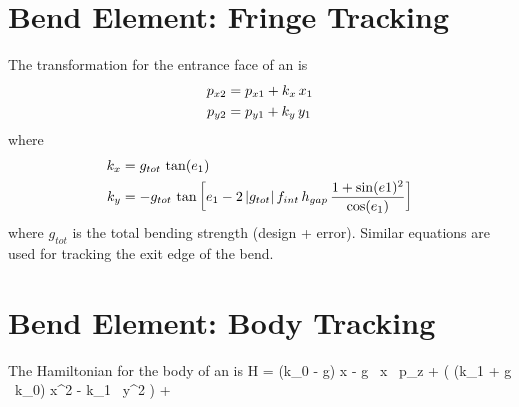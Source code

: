 \section{Bend Element: Fringe Tracking}
\label{s:.bend.fringe.std}

The transformation for the entrance face of an  is
\begin{align}
  p_{x2} &= p_{x1} + k_x \, x_1 \nonumber \\
  p_{y2} &= p_{y1} + k_y \, y_1
\end{align}
where
\begin{align}
  k_x &= g_{tot} \, \tan(e_1) \nonumber \\
  k_y &= -g_{tot} \, \tan \left[ e_1 - 2 \, |g_{tot}| \, f_{int} \,  h_{gap} \, 
    \frac{1 + \sin(e1)^2}{\cos(e_1)} \right]
\end{align}
where $g_{tot}$ is the total bending strength (design +
error). Similar equations are used for tracking the exit edge of the
bend.

\section{Bend Element: Body Tracking}
\label{s:bend.body.std}

The Hamiltonian for the body of an  is
\Begineq
  H = (k_0 - g) x - g \, x \, p_z + 
  \left( (k_1 + g \, k_0) x^2 - k_1 \, y^2 \right) +
\Endeq

